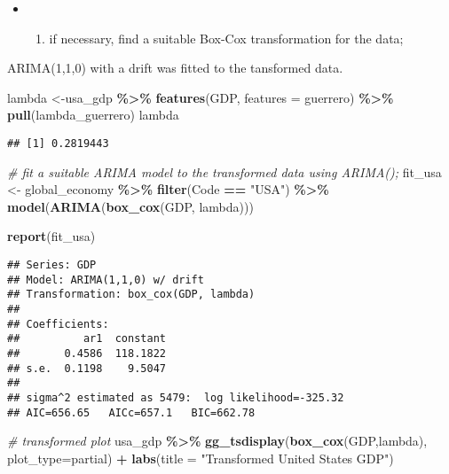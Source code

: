 \documentclass[
]{article}
\newenvironment{Shaded}{\begin{snugshade}}{\end{snugshade}}
\newcommand{\AttributeTok}[1]{\textcolor[rgb]{0.13,0.29,0.53}{#1}}
\newcommand{\CommentTok}[1]{\textcolor[rgb]{0.56,0.35,0.01}{\textit{#1}}}
\newcommand{\FunctionTok}[1]{\textcolor[rgb]{0.13,0.29,0.53}{\textbf{#1}}}
\newcommand{\NormalTok}[1]{#1}
\newcommand{\OtherTok}[1]{\textcolor[rgb]{0.56,0.35,0.01}{#1}}
\newcommand{\SpecialCharTok}[1]{\textcolor[rgb]{0.81,0.36,0.00}{\textbf{#1}}}
\newcommand{\StringTok}[1]{\textcolor[rgb]{0.31,0.60,0.02}{#1}}
\providecommand{\tightlist}{%
  \setlength{\itemsep}{0pt}\setlength{\parskip}{0pt}}
\begin{document}
\begin{itemize}
\item
  \begin{enumerate}
  \def\labelenumi{\alph{enumi}.}
  \tightlist
  \item
    if necessary, find a suitable Box-Cox transformation for the data;
  \end{enumerate}
\end{itemize}

ARIMA(1,1,0) with a drift was fitted to the tansformed data.

\begin{Shaded}
\begin{Highlighting}[]
\NormalTok{lambda  }\OtherTok{\textless{}{-}}\NormalTok{usa\_gdp }\SpecialCharTok{\%\textgreater{}\%}
  \FunctionTok{features}\NormalTok{(GDP, }\AttributeTok{features =}\NormalTok{ guerrero) }\SpecialCharTok{\%\textgreater{}\%}
  \FunctionTok{pull}\NormalTok{(lambda\_guerrero)}
\NormalTok{lambda}
\end{Highlighting}
\end{Shaded}

\begin{verbatim}
## [1] 0.2819443
\end{verbatim}

\begin{Shaded}
\begin{Highlighting}[]
\CommentTok{\# fit a suitable ARIMA model to the transformed data using ARIMA();}
\NormalTok{fit\_usa }\OtherTok{\textless{}{-}}\NormalTok{ global\_economy }\SpecialCharTok{\%\textgreater{}\%}
  \FunctionTok{filter}\NormalTok{(Code }\SpecialCharTok{==} \StringTok{"USA"}\NormalTok{) }\SpecialCharTok{\%\textgreater{}\%}
  \FunctionTok{model}\NormalTok{(}\FunctionTok{ARIMA}\NormalTok{(}\FunctionTok{box\_cox}\NormalTok{(GDP, lambda))) }

\FunctionTok{report}\NormalTok{(fit\_usa)}
\end{Highlighting}
\end{Shaded}

\begin{verbatim}
## Series: GDP 
## Model: ARIMA(1,1,0) w/ drift 
## Transformation: box_cox(GDP, lambda) 
## 
## Coefficients:
##          ar1  constant
##       0.4586  118.1822
## s.e.  0.1198    9.5047
## 
## sigma^2 estimated as 5479:  log likelihood=-325.32
## AIC=656.65   AICc=657.1   BIC=662.78
\end{verbatim}

\begin{Shaded}
\begin{Highlighting}[]
\CommentTok{\# transformed plot}
\NormalTok{usa\_gdp }\SpecialCharTok{\%\textgreater{}\%}
  \FunctionTok{gg\_tsdisplay}\NormalTok{(}\FunctionTok{box\_cox}\NormalTok{(GDP,lambda), }\AttributeTok{plot\_type=}\StringTok{\textquotesingle{}partial\textquotesingle{}}\NormalTok{) }\SpecialCharTok{+}
  \FunctionTok{labs}\NormalTok{(}\AttributeTok{title =} \StringTok{"Transformed United States GDP"}\NormalTok{)}
\end{Highlighting}
\end{Shaded}
\end{document}
